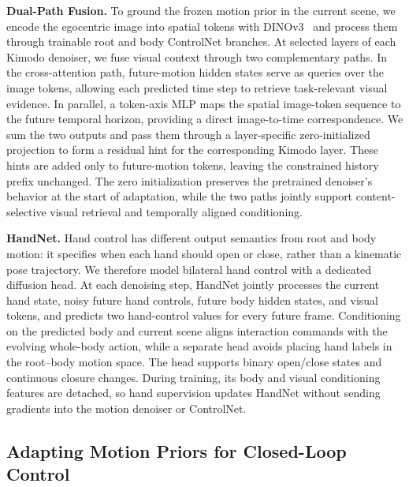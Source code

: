 \textbf{Dual-Path Fusion.} To ground the frozen motion prior in the current scene, we encode the egocentric image into spatial tokens with DINOv3~\cite{dinov3} and process them through trainable root and body ControlNet branches. At selected layers of each Kimodo denoiser, we fuse visual context through two complementary paths. In the cross-attention path, future-motion hidden states serve as queries over the image tokens, allowing each predicted time step to retrieve task-relevant visual evidence. In parallel, a token-axis MLP maps the spatial image-token sequence to the future temporal horizon, providing a direct image-to-time correspondence. We sum the two outputs and pass them through a layer-specific zero-initialized projection to form a residual hint for the corresponding Kimodo layer. These hints are added only to future-motion tokens, leaving the constrained history prefix unchanged. The zero initialization preserves the pretrained denoiser's behavior at the start of adaptation, while the two paths jointly support content-selective visual retrieval and temporally aligned conditioning.

\textbf{HandNet.} Hand control has different output semantics from root and body motion: it specifies when each hand should open or close, rather than a kinematic pose trajectory. We therefore model bilateral hand control with a dedicated diffusion head. At each denoising step, HandNet jointly processes the current hand state, noisy future hand controls, future body hidden states, and visual tokens, and predicts two hand-control values for every future frame. Conditioning on the predicted body and current scene aligns interaction commands with the evolving whole-body action, while a separate head avoids placing hand labels in the root--body motion space. The head supports binary open/close states and continuous closure changes. During training, its body and visual conditioning features are detached, so hand supervision updates HandNet without sending gradients into the motion denoiser or ControlNet.

\subsection{Adapting Motion Priors for Closed-Loop Control}
\label{sec:t2m_transfer}

